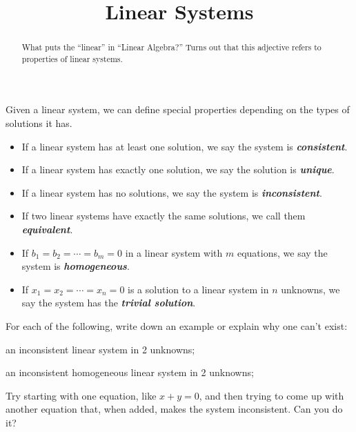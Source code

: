 \documentclass[hidelinks,12pt,handout]{ximera}
\title{Linear Systems}
\newcommand{\defi}[1]{\textbf{\textit{#1}}}
\begin{document}
\begin{abstract}{What puts the ``linear'' in ``Linear Algebra?'' Turns out that this adjective refers to properties of linear systems.}\end{abstract}
\maketitle

\begin{definition} Given a linear system, we can define special properties depending on the types of solutions it has.
\begin{itemize}
\item If a linear system has at least one solution, we say the system is \defi{consistent}.
\item If a linear system has exactly one solution, we say the solution is \defi{unique}.
\item If a linear system has no solutions, we say the system is \defi{inconsistent}.
\item If two linear systems have exactly the same solutions, we call them \defi{equivalent}.
\item If $b_1 = b_2 = \cdots = b_m = 0$ in a linear system with $m$ equations, we say the system is \defi{homogeneous}.
\item If $x_1 = x_2 = \cdots = x_n = 0$ is a solution to a linear system in $n$ unknowns, we say the system has the \defi{trivial solution}.
\end{itemize}
\end{definition}

For each of the following, write down an example or explain why one can't exist:
\begin{question}
an inconsistent linear system in 2 unknowns;
\vfill
\end{question}

\begin{question}
an inconsistent homogeneous linear system in 2 unknowns;
\vfill
\begin{hint} Try starting with one equation, like $x+y = 0$, and then trying to come up with another equation that, when added, makes the system inconsistent. Can you do it? \end{hint}
\end{question}
\end{document}
